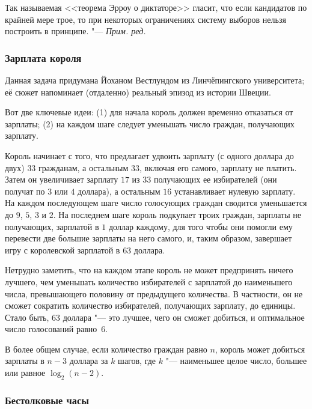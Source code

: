 \documentclass[twoside]{book}
\newenvironment{addedbytheeditors}{\par\medskip\small
}{\par\addvspace{\medskipamount}} %
\begin{document}
\begin{addedbytheeditors}
Так называемая <<теорема Эрроу о диктаторе>> гласит, что если
кандидатов по крайней мере трое, то при некоторых ограничениях систему
выборов нельзя построить в принципе. "--- \emph{Прим. ред.}
\end{addedbytheeditors}

\subsubsection*{Зарплата короля}%

Данная задача придумана Йоханом Вестлундом %
из Линчёпингского университета; её сюжет напоминает (отдаленно)
реальный эпизод из истории Швеции.

Вот две ключевые идеи: (1) для начала король должен временно
отказаться от зарплаты; (2) на каждом шаге следует уменьшать число граждан, получающих зарплату.

Король начинает с того, что предлагает удвоить зарплату
(с одного доллара до двух) $33$ гражданам, а остальным $33$, включая
его самого, зарплату не платить.
Затем он увеличивает зарплату $17$ из $33$ получающих ее избирателей
(они получат по $3$ или $4$ доллара), а остальным $16$ устанавливает
нулевую зарплату.
На каждом последующем шаге число голосующих граждан сводится
уменьшается до $9$, $5$, $3$ и $2$.
На последнем шаге король подкупает троих граждан, зарплаты не
получающих, зарплатой в $1$ доллар каждому, для того чтобы они помогли ему перевести две большие зарплаты на него самого, и, таким образом, завершает игру с королевской зарплатой в $63$ доллара.

Нетрудно заметить, что на каждом этапе король не может предпринять
ничего лучшего, чем уменьшать количество избирателей с зарплатой до
наименьшего числа, превышающего половину от предыдущего количества.
В частности, он не сможет сократить количество избирателей, получающих
зарплату, до единицы.
Стало быть, $63$ доллара "--- это лучшее, чего он сможет добиться, и оптимальное число голосований равно~$6$.
\heart

\medskip

В более общем случае, если количество граждан равно $n$, король может добиться зарплаты в $n-3$ доллара за $k$ шагов, где $k$ "--- наименьшее целое число, большее или равное $\log_2(n-2)$.

\subsubsection*{Бестолковые часы}%
\end{document}

